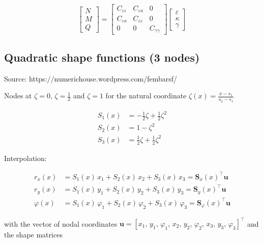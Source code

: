 \begin{equation}
\begin{bmatrix}
N \\ M \\ Q
\end{bmatrix}
=
\begin{bmatrix}
C_{\varepsilon\varepsilon} & C_{\varepsilon\kappa} & 0 \\
C_{\varepsilon\kappa} & C_{\varepsilon\varepsilon} & 0 \\
0 & 0 & C_{\gamma\gamma}
\end{bmatrix}
\begin{bmatrix}
\varepsilon \\ \kappa \\ \gamma
\end{bmatrix}
\end{equation}

\subsection{Quadratic shape functions (3 nodes)}

Source: https://numerichouse.wordpress.com/fembarsf/

Nodes at $\zeta = 0$, $\zeta = \frac{1}{2}$ and $\zeta = 1$ for the natural coordinate $\zeta(x) = \frac{x - s_{1}}{s_{2} - s_{1}}$

\begin{align}
S_1(x) &= -\frac{1}{2}\zeta + \frac{1}{2}\zeta^2 \\
S_2(x) &= 1 - \zeta^2 \\
S_3(x) &= \frac{1}{2}\zeta + \frac{1}{2}\zeta^2
\end{align}

Interpolation:

\begin{align}
r_x(x) &= S_1(x)\,x_1 + S_2(x)\,x_2 + S_3(x)\,x_3 = \boldsymbol{S}_{x}(x)^\intercal\boldsymbol{u} \\
r_y(x) &= S_1(x)\,y_1 + S_2(x)\,y_2 + S_3(x)\,y_3 = \boldsymbol{S}_{y}(x)^\intercal\boldsymbol{u} \\
\varphi(x) &= S_1(x)\,\varphi_1 + S_2(x)\,\varphi_2 + S_3(x)\,\varphi_3 = \boldsymbol{S}_{\varphi}(x)^\intercal\boldsymbol{u}
\end{align}

with the vector of nodal coordinates $\boldsymbol{u} = \left[x_1,\,y_1,\,\varphi_1,\,x_2,\,y_2,\,\varphi_2,\,x_3,\,y_3,\,\varphi_3\right]^\intercal$ and the shape matrices


